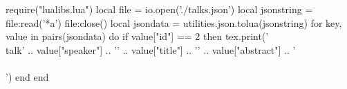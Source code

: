 \begin{luacode}
  require("lualibs.lua")
  local file = io.open('./talks.json')
  local jsonstring = file:read('*a')
  file:close()
  local jsondata =  utilities.json.tolua(jsonstring)
  for key, value in pairs(jsondata) do
    if value["id"] == 2 then 
        tex.print('\\talk{' .. 
          value["speaker"]  .. 
          '}{'              .. 
          value["title"]    .. 
          '}{'              .. 
          value["abstract"] .. 
          '}\\\\[1em]')
    end
  end
\end{luacode}